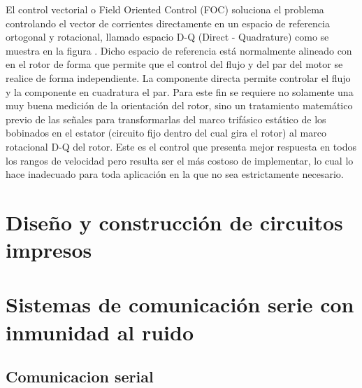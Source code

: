 El control vectorial o Field Oriented Control (FOC) soluciona el problema controlando el vector de corrientes directamente en un espacio de referencia ortogonal y rotacional, llamado espacio D-Q (Direct - Quadrature) como se muestra en la figura . Dicho
espacio de referencia está normalmente alineado con en el rotor de forma que permite que el control del flujo y del par del motor se realice de forma independiente. La componente directa permite controlar el flujo y la componente en cuadratura el par. Para este fin se requiere no solamente una muy buena medición de la orientación del rotor, sino un tratamiento matemático previo de las señales para transformarlas del marco trifásico estático de los bobinados en el estator (circuito fijo dentro del cual gira el rotor) al marco rotacional D-Q del rotor. Este es el control que presenta mejor respuesta en todos los rangos de velocidad pero resulta ser el más costoso de implementar, lo cual lo hace inadecuado para toda aplicación en la que no sea estrictamente necesario.





\section{Diseño y construcción de circuitos impresos} %
\label{sec:diseno_y_construccion_de_circuitos_impresos}



\section{Sistemas de comunicación serie con inmunidad al ruido} %
\label{sec:sistemas_de_comunicacion_serie_con_inmunidad_al_ruido}


\subsection{Comunicacion serial} %
\label{sub:comunicacion_serial}


